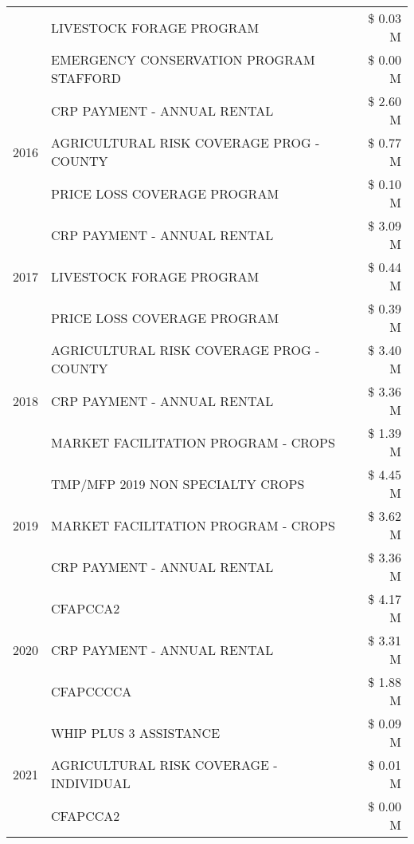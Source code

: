 \begin{tabular}{llr}
 & LIVESTOCK FORAGE PROGRAM & \$ 0.03 M \\
 & EMERGENCY CONSERVATION PROGRAM STAFFORD & \$ 0.00 M \\
\cline{1-3}
\multirow[t]{3}{*}{2016} & CRP PAYMENT - ANNUAL RENTAL & \$ 2.60 M \\
 & AGRICULTURAL RISK COVERAGE PROG - COUNTY & \$ 0.77 M \\
 & PRICE LOSS COVERAGE PROGRAM & \$ 0.10 M \\
\cline{1-3}
\multirow[t]{3}{*}{2017} & CRP PAYMENT - ANNUAL RENTAL & \$ 3.09 M \\
 & LIVESTOCK FORAGE PROGRAM & \$ 0.44 M \\
 & PRICE LOSS COVERAGE PROGRAM & \$ 0.39 M \\
\cline{1-3}
\multirow[t]{3}{*}{2018} & AGRICULTURAL RISK COVERAGE PROG - COUNTY & \$ 3.40 M \\
 & CRP PAYMENT - ANNUAL RENTAL & \$ 3.36 M \\
 & MARKET FACILITATION PROGRAM - CROPS & \$ 1.39 M \\
\cline{1-3}
\multirow[t]{3}{*}{2019} & TMP/MFP 2019 NON SPECIALTY CROPS & \$ 4.45 M \\
 & MARKET FACILITATION PROGRAM - CROPS & \$ 3.62 M \\
 & CRP PAYMENT - ANNUAL RENTAL & \$ 3.36 M \\
\cline{1-3}
\multirow[t]{3}{*}{2020} & CFAPCCA2 & \$ 4.17 M \\
 & CRP PAYMENT - ANNUAL RENTAL & \$ 3.31 M \\
 & CFAPCCCCA & \$ 1.88 M \\
\cline{1-3}
\multirow[t]{3}{*}{2021} & WHIP PLUS 3 ASSISTANCE & \$ 0.09 M \\
 & AGRICULTURAL RISK COVERAGE - INDIVIDUAL & \$ 0.01 M \\
 & CFAPCCA2 & \$ 0.00 M \\
\cline{1-3}
\bottomrule
\end{tabular}
